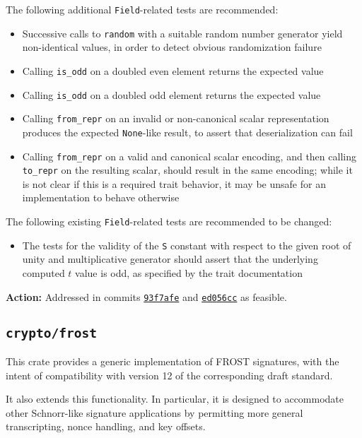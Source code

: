 \documentclass{article}
\begin{document}
The following additional \texttt{Field}-related tests are recommended:
\begin{itemize}
	\item Successive calls to \texttt{random} with a suitable random number generator yield non-identical values, in order to detect obvious randomization failure
	\item Calling \texttt{is\_odd} on a doubled even element returns the expected value
	\item Calling \texttt{is\_odd} on a doubled odd element returns the expected value
	\item Calling \texttt{from\_repr} on an invalid or non-canonical scalar representation produces the expected \texttt{None}-like result, to assert that deserialization can fail
	\item Calling \texttt{from\_repr} on a valid and canonical scalar encoding, and then calling \texttt{to\_repr} on the resulting scalar, should result in the same encoding; while it is not clear if this is a required trait behavior, it may be unsafe for an implementation to behave otherwise
\end{itemize}

The following existing \texttt{Field}-related tests are recommended to be changed:
\begin{itemize}
	\item The tests for the validity of the \texttt{S} constant with respect to the given root of unity and multiplicative generator should assert that the underlying computed $t$ value is odd, as specified by the trait documentation
\end{itemize}

\textbf{Action:} Addressed in commits \href{https://github.com/serai-dex/serai/commit/93f7afec8badb0e943e92dde7fd76ee40c474228}{\texttt{93f7afe}} and \href{https://github.com/serai-dex/serai/commit/ed056cceaf95fd4f2ce5cf3afb893e95c95feb06}{\texttt{ed056cc}} as feasible.


\subsection{\texttt{crypto/frost}}

This crate provides a generic implementation of FROST signatures, with the intent of compatibility with version 12 of the corresponding draft standard.

It also extends this functionality.
In particular, it is designed to accommodate other Schnorr-like signature applications by permitting more general transcripting, nonce handling, and key offsets.
\end{document}
